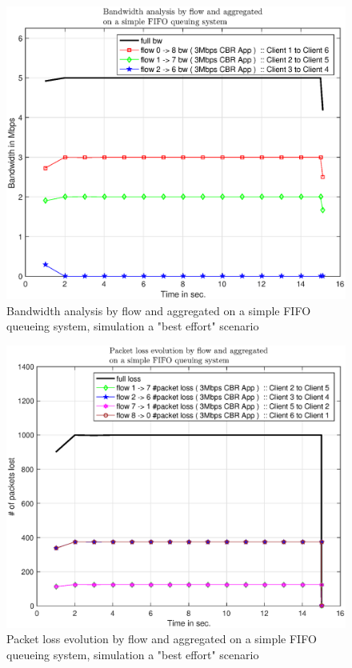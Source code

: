 \documentclass[conference,compsoc]{IEEEtran}
\begin{document}
    \begin{figure}[H]
    \centering
    \includegraphics[width=1\columnwidth]{EPS/A/bw_a2.eps}
    \caption{Bandwidth analysis by flow and aggregated on a simple FIFO queueing system, simulation a "best effort" scenario}
    \label{graph:bw_a2}
    \end{figure}
    
    
    \begin{figure}[H]
    \centering
    \includegraphics[width=1\columnwidth]{EPS/A/loss_a2.eps}
    \caption{Packet loss evolution by flow and aggregated on a simple FIFO queueing system, simulation a "best effort" scenario}\label{graph:loss_a2}
    \end{figure}
    
\end{document}
